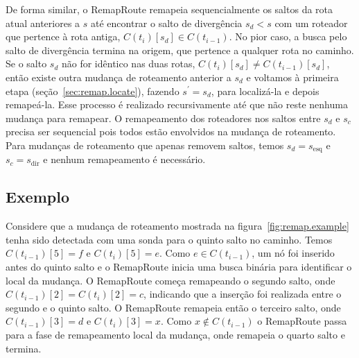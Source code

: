 \documentclass{JBCS}
\newcommand{\rmprt}{{Re\-map\-Rou\-te}}
\newcommand{\figstr}{figura}
\newcommand{\secstr}{seção}
\begin{document}
De forma similar, o \rmprt{} remapeia sequencialmente os saltos da rota
atual anteriores a $s$ até encontrar o salto de divergência $s_d < s$
com um roteador que pertence à rota antiga, $C(t_i)[s_d] \in
C(t_{i-1})$.  No pior caso, a busca pelo salto de divergência termina na
origem, que pertence a qualquer rota no caminho.  Se o salto $s_d$ não
for idêntico nas duas rotas, $C(t_i)[s_d] \ne C(t_{i-1})[s_d]$, então
existe outra mudança de roteamento anterior a $s_d$ e voltamos à
primeira etapa (\secstr~\ref{sec:remap.locate}), fazendo $s^\prime =
s_d$, para localizá-la e depois remapeá-la.  Esse processo é realizado
recursivamente até que não reste nenhuma mudança para remapear.
%
O remapeamento dos roteadores nos saltos entre $s_d$ e $s_c$ precisa ser
sequencial pois todos estão envolvidos na mudança de roteamento.  Para
mudanças de roteamento que apenas removem saltos, temos $s_d =
s_\mathrm{esq}$ e $s_c = s_\mathrm{dir}$ e nenhum remapeamento é
necessário.

\vspace{-3mm}
\subsection{Exemplo}

Considere que a mudança de roteamento mostrada na
\figstr~\ref{fig:remap.example} tenha sido detectada com uma sonda para
o quinto salto no caminho.  Temos $C(t_{i-1})[5] = f$ e $C(t_i)[5] = e$.
Como $e \in C(t_{i-1})$, um nó foi inserido antes do quinto salto e o
\rmprt{} inicia uma busca binária para identificar o local da mudança.
O \rmprt{} começa remapeando o segundo salto, onde $C(t_{i-1})[2] =
C(t_i)[2] = c$, indicando que a inserção foi realizada entre o segundo e
o quinto salto.  O \rmprt{} remapeia então o terceiro salto, onde
$C(t_{i-1})[3] = d$ e $C(t_i)[3] = x$.  Como $x \notin C(t_{i-1})$ o
\rmprt{} passa para a fase de remapeamento local da mudança, onde
remapeia o quarto salto e termina.
\end{document}
